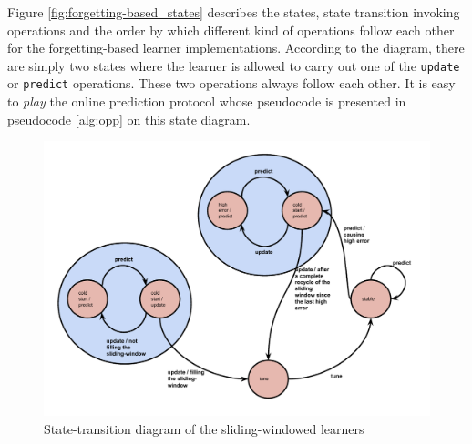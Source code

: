 Figure \ref{fig:forgetting-based_states} describes the states, state transition invoking operations and the order by which different kind of operations follow each other for the forgetting-based learner implementations. According to the diagram, there are simply two states where the learner is allowed to carry out one of the \texttt{update} or \texttt{predict} operations. These two operations always follow each other. It is easy to \textit{play} the online prediction protocol whose pseudocode is presented in pseudocode \ref{alg:opp} on this state diagram.

\begin{figure}[htbp]
  \centering
    \includegraphics[width=\linewidth]{./Figures/sliding-windowed_states.pdf}
  \caption{State-transition diagram of the sliding-windowed learners}
  \label{fig:sliding-windowed_states}
\end{figure}

